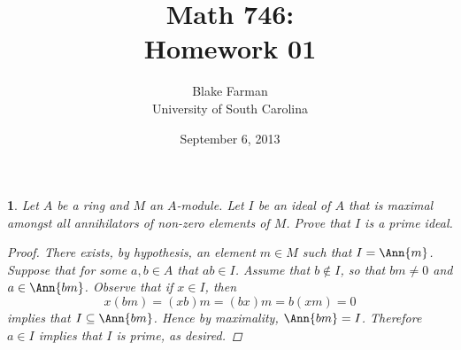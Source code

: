 \documentclass[10pt]{amsart}
\author{Blake Farman\\University of South Carolina}
\title{Math 746:\\Homework 01}
\date{September 6, 2013}
\begin{document}
\maketitle

\providecommand{\p}{\mathfrak{p}}
\providecommand{\m}{\mathfrak{m}}
\newtheorem{thm}{}
\newtheorem{lem}{Lemma}

\begin{thm}
  Let $A$ be a ring and $M$ an $A$-module.
  Let $I$ be an ideal of $A$ that is maximal amongst all annihilators of non-zero elements of $M$.
  Prove that $I$ is a prime ideal.

  \begin{proof}
    There exists, by hypothesis, an element $m \in M$ such that $I = \Ann{m}$.
    Suppose that for some $a, b \in A$ that $ab \in I$.
    Assume that $b \not \in I$, so that $bm \neq 0$ and $a \in \Ann{bm}$.
    Observe that if $x \in I$, then
    $$x(bm) = (xb)m = (bx)m = b(xm) = 0$$
    implies that $I \subseteq \Ann{bm}$.
    Hence by maximality, $\Ann{bm} = I$.
    Therefore $a \in I$ implies that $I$ is prime, as desired.
  \end{proof}
\end{thm}
\end{document}
